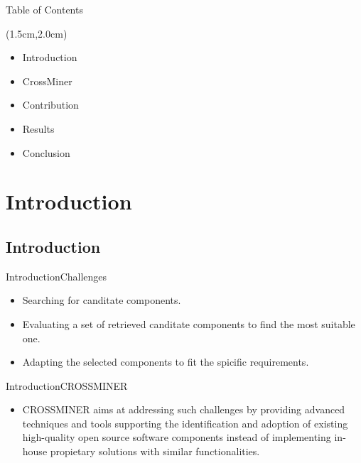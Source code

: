 \documentclass{beamer}
\begin{document}
\begin{frame}{Table of Contents}%

\begin{textblock*}{5.0cm}(1.5cm,2.0cm)
\begin{itemize}
	\item Introduction
	\item CrossMiner
	\item Contribution
	\item Results
	\item Conclusion
\end{itemize}

\end{textblock*}
\end{frame}

\section{Introduction}
\subsection{Introduction}

\begin{frame}{Introduction}{Challenges}

\begin{itemize}
	\item Searching for canditate components.
	\item Evaluating a set of retrieved canditate components to find the most suitable one.
	\item Adapting the selected components to fit the spicific requirements.
\end{itemize}

\end{frame}

\begin{frame}{Introduction}{CROSSMINER}
\begin{itemize}
	\item CROSSMINER aims at addressing such challenges by providing
	advanced techniques and tools supporting the identification
	and adoption of existing high-quality open source software 
	components instead of implementing in-house propietary solutions
	with similar functionalities.
\end{itemize}

\end{frame}
\end{document}
